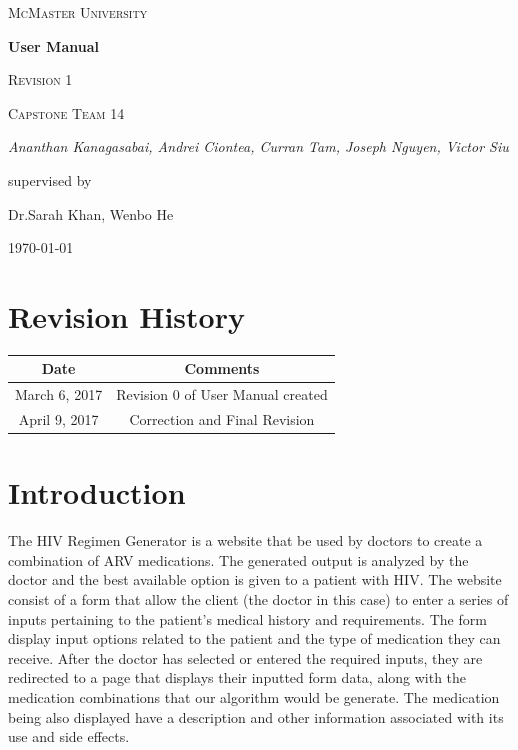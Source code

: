 \documentclass[12pt]{article}
\begin{document}
\begin{titlepage}
	\centering
	{\scshape\LARGE McMaster University \par}
	\vspace{1.5cm}
	{\huge\bfseries User Manual \par}
	{\scshape\Large Revision 1 \par}

	\vspace{1cm}
	{\scshape\Large Capstone Team 14\par}
	{\Large\itshape Ananthan Kanagasabai, Andrei Ciontea, Curran Tam, Joseph Nguyen, Victor Siu \par}
	\vspace{3cm}
	\vfill
	supervised by\par
	Dr.Sarah Khan, Wenbo He

	\vfill
	{\large \today\par}
\end{titlepage}

\newpage

\tableofcontents
\listoffigures

\newpage

\section*{Revision History}
\begin{tabular}{|c|c|}
\hline
\textbf{Date}  & \textbf{Comments} \\ \hline
March 6, 2017 & Revision 0 of User Manual created \\ 
\hline
April 9, 2017 & Correction and Final Revision\\
\hline
\end{tabular}

\newpage


\section{Introduction}
The HIV Regimen Generator is a website that be used by doctors to create a combination of ARV medications. The generated output is analyzed by the doctor and the best available option is given to a patient with HIV. The website consist of a form that allow the client (the doctor in this case) to enter a series of inputs pertaining to the patient's medical history and requirements. The form display input options related to the patient and the type of medication they can receive. After the doctor has selected or entered the required inputs, they are redirected to a page that displays their inputted form data, along with the medication combinations that our algorithm would be generate. The medication being also displayed have a description and other information associated with its use and side effects.
\end{document}
